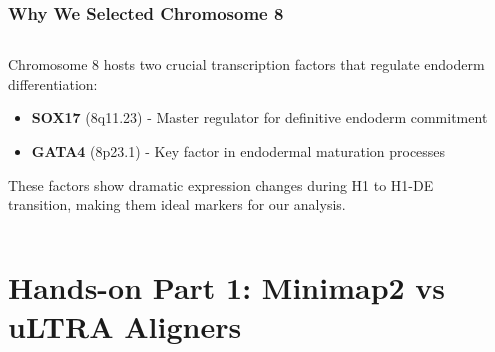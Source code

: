 \documentclass[aspectratio=169]{beamer}
\begin{document}
\begin{frame}
  \frametitle{Why We Selected Chromosome 8}
  \begin{columns}[T]
    \begin{column}{0.55\textwidth}
      Chromosome 8 hosts two crucial transcription factors that regulate endoderm differentiation:
      
      \vspace{0.5cm}
      \begin{itemize}
        \item \textbf{SOX17} (8q11.23) - Master regulator for definitive endoderm commitment
        \item \textbf{GATA4} (8p23.1) - Key factor in endodermal maturation processes
      \end{itemize}
      
      \vspace{0.5cm}
      These factors show dramatic expression changes during H1 to H1-DE transition, making them ideal markers for our analysis.
    \end{column}
    \begin{column}{0.4\textwidth}
      \centering
    \end{column}
  \end{columns}
\end{frame}



\section{Hands-on Part 1: Minimap2 vs uLTRA Aligners}
\end{document}
